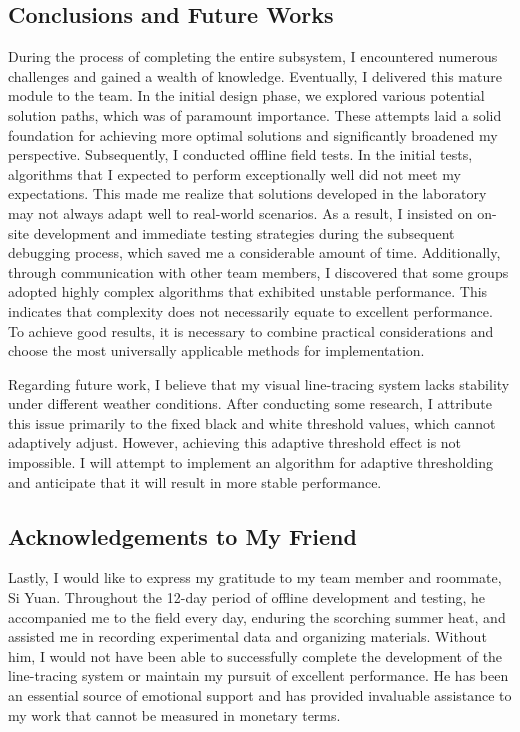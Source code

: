 \documentclass[12pt, a4paper, oneside]{report}
\begin{document}
\subsection{Conclusions and Future Works}
During the process of completing the entire subsystem, I encountered numerous challenges and gained a wealth of knowledge. Eventually, I delivered this mature module to the team. In the initial design phase, we explored various potential solution paths, which was of paramount importance. These attempts laid a solid foundation for achieving more optimal solutions and significantly broadened my perspective. Subsequently, I conducted offline field tests. In the initial tests, algorithms that I expected to perform exceptionally well did not meet my expectations. This made me realize that solutions developed in the laboratory may not always adapt well to real-world scenarios. As a result, I insisted on on-site development and immediate testing strategies during the subsequent debugging process, which saved me a considerable amount of time. Additionally, through communication with other team members, I discovered that some groups adopted highly complex algorithms that exhibited unstable performance. This indicates that complexity does not necessarily equate to excellent performance. To achieve good results, it is necessary to combine practical considerations and choose the most universally applicable methods for implementation.

Regarding future work, I believe that my visual line-tracing system lacks stability under different weather conditions. After conducting some research, I attribute this issue primarily to the fixed black and white threshold values, which cannot adaptively adjust. However, achieving this adaptive threshold effect is not impossible. I will attempt to implement an algorithm for adaptive thresholding and anticipate that it will result in more stable performance.

\subsection{Acknowledgements to My Friend}
Lastly, I would like to express my gratitude to my team member and roommate, Si Yuan. Throughout the 12-day period of offline development and testing, he accompanied me to the field every day, enduring the scorching summer heat, and assisted me in recording experimental data and organizing materials. Without him, I would not have been able to successfully complete the development of the line-tracing system or maintain my pursuit of excellent performance. He has been an essential source of emotional support and has provided invaluable assistance to my work that cannot be measured in monetary terms.
\end{document}
